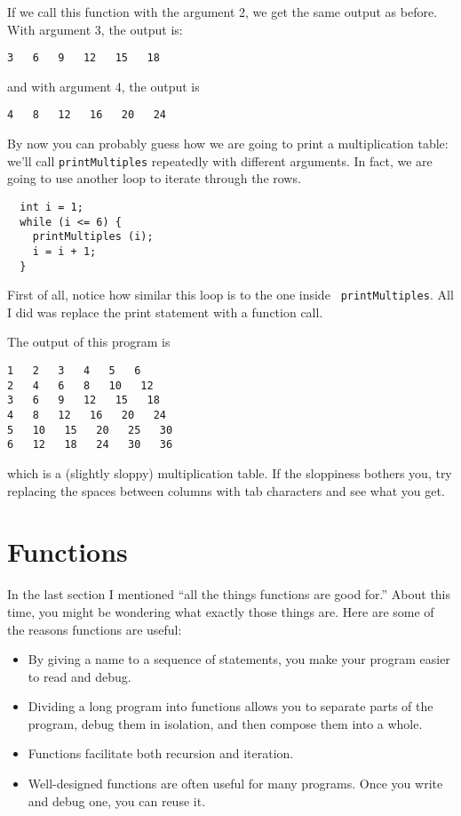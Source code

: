 If we call this function with the argument 2, we get the same
output as before.  With argument 3, the output is:

\begin{verbatim}
3   6   9   12   15   18
\end{verbatim}
%
and with argument 4, the output is

\begin{verbatim}
4   8   12   16   20   24 
\end{verbatim}
%
By now you can probably guess how we are going to print a
multiplication table: we'll call {\tt printMultiples} repeatedly with
different arguments.  In fact, we are going to use another loop to
iterate through the rows.

\begin{verbatim}
  int i = 1;
  while (i <= 6) {
    printMultiples (i);
    i = i + 1;
  }    
\end{verbatim}
%
First of all, notice how similar this loop is to the one inside {\tt
printMultiples}.  All I did was replace the print statement with a
function call.

The output of this program is

\begin{verbatim}
1   2   3   4   5   6   
2   4   6   8   10   12   
3   6   9   12   15   18   
4   8   12   16   20   24   
5   10   15   20   25   30   
6   12   18   24   30   36   
\end{verbatim}
%
which is a (slightly sloppy) multiplication table.  If the
sloppiness bothers you, try replacing the spaces between
columns with tab characters and see what you get.

\section{Functions}

In the last section I mentioned ``all the things functions
are good for.''  About this time, you might be wondering
what exactly those things are.  Here are some of the reasons
functions are useful:

\begin{itemize}

\item By giving a name to a sequence of statements, you make
your program easier to read and debug.

\item Dividing a long program into functions allows you to
separate parts of the program, debug them in isolation, and
then compose them into a whole.

\item Functions facilitate both recursion and iteration.

\item Well-designed functions are often useful for many programs.
Once you write and debug one, you can reuse it.

\end{itemize}

